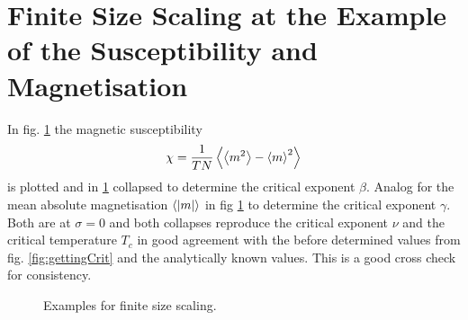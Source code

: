 \section{Finite Size Scaling at the Example of the Susceptibility and Magnetisation}
\label{appendix:finiteSizeScaling}
    In fig. \ref{fig:gettingCrit:appendix}
    the magnetic susceptibility
    \[\chi = \frac{1}{TN}\left< \left< m^2 \right> - \left< m \right>^2 \right>\]
    is plotted and in \ref{fig:gettingCrit:appendix}
    collapsed to determine the critical exponent \(\beta\).
    Analog for the mean absolute magnetisation \(\left< \left\vert m\right\vert \right>\) in fig \ref{fig:gettingCrit:appendix}
    to determine the critical exponent \(\gamma\).
    Both are at \(\sigma=0\) and
    both collapses reproduce the  critical exponent \(\nu\) and the
    critical temperature \(T_c\) in good agreement with the before determined
    values from fig. \ref{fig:gettingCrit}
    and the analytically known values. This is a good cross check
    for consistency.
    \begin{figure}[htbp]
        \centering
        \caption[Examples of determining critical temperature and exponents]
        {
            Examples for finite size scaling.
        }
        \label{fig:gettingCrit:appendix}
    \end{figure}
